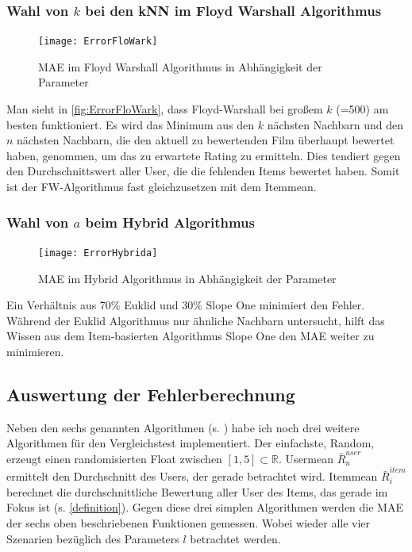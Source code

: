 \subsubsection{Wahl von $k$ bei den kNN im Floyd Warshall Algorithmus}\label{s.kflowar}
\begin{figure}[h!]
\centering
\texttt{[image: ErrorFloWark]}
\caption{MAE im Floyd Warshall Algorithmus in Abhängigkeit der Parameter}
\label{fig:ErrorFloWark}
\end{figure}
Man sieht in \autoref{fig:ErrorFloWark}, dass Floyd-Warshall bei großem $k$ (=500) am besten funktioniert. Es wird das Minimum aus den $k$ nächsten Nachbarn und den $n$ nächsten Nachbarn, die den aktuell zu bewertenden Film überhaupt bewertet haben, genommen, um das zu erwartete Rating zu ermitteln. Dies tendiert gegen den Durchschnittswert aller User, die die fehlenden Items bewertet haben. Somit ist der FW-Algorithmus fast gleichzusetzen mit dem Itemmean.
\clearpage

\subsubsection{Wahl von $a$ beim Hybrid Algorithmus}\label{s.alugu}

\begin{figure}[h!]
\centering
\texttt{[image: ErrorHybrida]}
\caption{MAE im Hybrid Algorithmus in Abhängigkeit der Parameter}
\label{fig:ErrorLUSGUSa}
\end{figure}
\FloatBarrier
Ein Verhältnis aus 70\% Euklid und 30\% Slope One minimiert den Fehler. Während der Euklid Algorithmus nur ähnliche Nachbarn untersucht, hilft das Wissen aus dem Item-basierten Algorithmus Slope One den MAE weiter zu minimieren.


\subsection{Auswertung der Fehlerberechnung}\label{s.auswertung}
Neben den sechs genannten Algorithmen (s. ) habe ich noch drei weitere Algorithmen für den Vergleichstest implementiert. Der einfachste, Random, erzeugt einen randomisierten Float zwischen $[1,5]\subset \mathbb{R}$. Usermean $\bar{R}^{user}_{u}$ ermittelt den Durchschnitt des Users, der gerade betrachtet wird. Itemmean $\bar{R}^{item}_{i}$ berechnet die durchschnittliche Bewertung aller User des Items, das gerade im Fokus ist (s. \autoref{definition}). 
Gegen diese drei simplen Algorithmen werden die MAE der sechs oben beschriebenen Funktionen gemessen. Wobei wieder alle vier Szenarien bezüglich des Parameters $l$ betrachtet werden.\\

